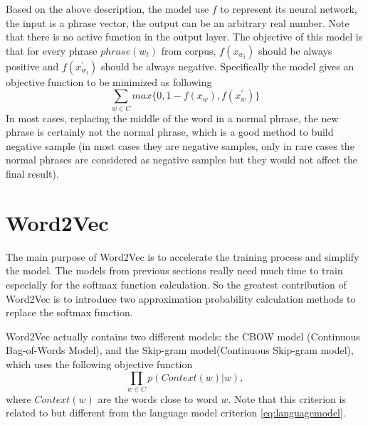 Based on the above description, the model use $f$ to represent its neural network, the input is a phrase vector, the output can be an arbitrary real number. Note that there is no active function in the output layer. The objective of this model is that for every phrase $phrase(w_t)$ from corpus,  $f(x_{w_t})$ should be always positive and $f(x^\prime_{w_t})$ should be always negative. Specifically the model gives an objective function to be minimized as following
\begin{equation}\label{eq:skipgram}
\sum_{w\in C}max\{0,1-f(x_{w}),f(x^\prime_{w})\}
\end{equation}
In most cases, replacing the middle of the word in a normal phrase, the new phrase is certainly not the normal phrase, which is a good method to build negative sample (in most cases they are negative samples, only in rare cases the normal phrases are considered as negative samples but they would not affect the final result). \\


\section{Word2Vec}

The main purpose of Word2Vec is to accelerate the training process and simplify the model. The models from previous sections really need much time to train especially for the softmax function calculation. So the greatest contribution of Word2Vec is to introduce two approximation probability calculation methods to replace the softmax function. 

Word2Vec actually contains two different models: the CBOW model (Continuous Bag-of-Words Model),   and the Skip-gram model(Continuous Skip-gram model), which uses the following objective function 
\begin{equation}
\prod_{w\in C}p(Context(w)|w),
\end{equation}
where $Context(w)$ are the words close to word $w$. Note that this criterion is related to but different from the language model criterion \ref{eq:languagemodel}.


